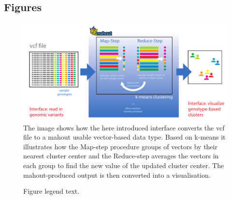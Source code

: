 \documentclass[twocolumn]{bmcart}%
\begin{document}
\begin{backmatter}


\section*{Figures}
  \begin{figure}[h!]
  \includegraphics[type=pdf,ext=.pdf,read=.pdf, scale=0.40]{images/signature}
  \caption{
      The image shows how the here introduced interface converts the vcf file to a mahout usable vector-based data type. Based on k-means it illustrates how the Map-step procedure groups of vectors by their nearest cluster center and the Reduce-step averages the vectors in each group to find the new value of the updated cluster center. The mahout-produced output is then converted into a visualisation.}
      \end{figure}

\begin{figure}[h!]
  \caption{
      Figure legend text.}
      \end{figure}



\end{backmatter}
\end{document}
